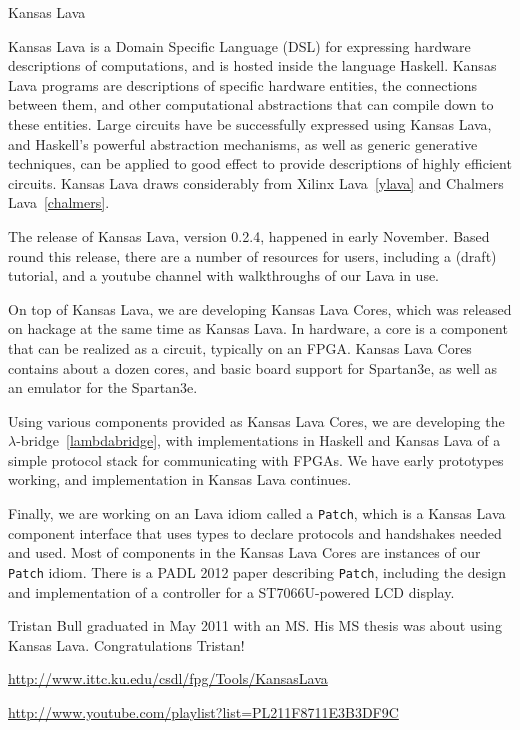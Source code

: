 \begin{hcarentry}{Kansas Lava}
\label{klava}
\makeheader

Kansas Lava is a Domain Specific Language (DSL) for expressing
hardware descriptions of computations, and is hosted inside the
language Haskell. Kansas Lava programs are descriptions of specific hardware
entities, the connections between them, and other computational abstractions
that can compile down to these entities. Large circuits have be successfully
expressed using Kansas Lava, and Haskell's powerful abstraction mechanisms, as
well as generic generative techniques, can be applied to good effect to provide
descriptions of highly efficient circuits.
Kansas Lava draws considerably from Xilinx Lava~\cref{ylava} and
Chalmers Lava~\cref{chalmers}.

The release of Kansas Lava, version 0.2.4, happened in early November.
Based round this release, there are a number of resources for users,
including a (draft) tutorial, and a youtube channel with
walkthroughs of our Lava in use.

On top of Kansas Lava, we are developing Kansas Lava Cores, which was released
on hackage at the same time as Kansas Lava. In hardware, a core is a component
that can be realized as a circuit, typically on an FPGA. Kansas Lava Cores
contains about a dozen cores, and basic board support for Spartan3e,
as well as an emulator for the Spartan3e.

Using various components provided as Kansas Lava Cores, we are developing the
$\lambda$-bridge~\cref{lambdabridge}, with implementations in Haskell and
Kansas Lava of a simple protocol stack for communicating with FPGAs. We have
early prototypes working, and implementation in Kansas Lava continues.

Finally, we are working on an Lava idiom called a {\tt Patch}, which is a Kansas
Lava component interface that uses types to declare protocols and handshakes
needed and used. Most of components in the Kansas Lava Cores are instances of
our {\tt Patch} idiom. There is a PADL 2012 paper describing {\tt Patch},
including the design and implementation of a controller for a ST7066U-powered
LCD display.

Tristan Bull graduated in May 2011 with an MS. His MS thesis was about using
Kansas Lava. Congratulations Tristan!

\FurtherReading
\begin{compactitem}
\item
  \url{http://www.ittc.ku.edu/csdl/fpg/Tools/KansasLava}\\
\item
  \url{http://www.youtube.com/playlist?list=PL211F8711E3B3DF9C}  
\end{compactitem}
\end{hcarentry}
